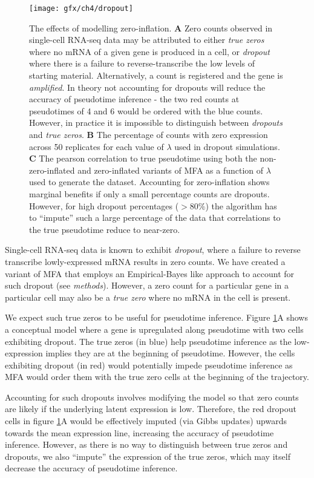 \begin{figure}
	\centering
	\texttt{[image: gfx/ch4/dropout]}
	\caption{The effects of modelling zero-inflation. {\normalfont
\textbf{A} Zero counts observed in single-cell RNA-seq data may be attributed to either \emph{true zeros} where no mRNA of a given gene is produced in a cell, or \emph{dropout} where there is a failure to reverse-transcribe the low levels of starting material. Alternatively, a count is registered and the gene is \emph{amplified}. In theory not accounting for dropouts will reduce the accuracy of pseudotime inference - the two red counts at pseudotimes of 4 and 6 would be ordered with the blue counts. However, in practice it is impossible to distinguish between \emph{dropouts} and \emph{true zeros}.
\textbf{B} The percentage of counts with zero expression across 50 replicates for each value of $\lambda$ used in dropout simulations.
\textbf{C} The pearson correlation to true pseudotime using both the non-zero-inflated and zero-inflated variants of MFA as a function of $\lambda$ used to generate the dataset. Accounting for zero-inflation shows marginal benefits if only a small percentage counts are dropouts. However, for high dropout percentages ($>80\%$) the algorithm has to ``impute'' such a large percentage of the data that correlations to the true pseudotime reduce to near-zero.
	}} \label{fig:dropout_results}
\end{figure}

Single-cell RNA-seq data is known to exhibit \emph{dropout}, where a failure to reverse transcribe lowly-expressed mRNA results in zero counts. We have created a variant of MFA that employs an Empirical-Bayes like approach to account for such dropout (see \emph{methods}). However, a zero count for a particular gene in a particular cell may also be a \emph{true zero} where no mRNA in the cell is present.

We expect such true zeros to be useful for pseudotime inference. Figure \ref{fig:dropout_results}A shows a conceptual model where a gene is upregulated along pseudotime with two cells exhibiting dropout. The true zeros (in blue) help pseudotime inference as the low-expression implies they are at the beginning of pseudotime. However, the cells exhibiting dropout (in red) would potentially impede pseudotime inference as MFA would order them with the true zero cells at the beginning of the trajectory.

Accounting for such dropouts involves modifying the model so that zero counts are likely if the underlying latent expression is low. Therefore, the red dropout cells in figure \ref{fig:dropout_results}A would be effectively imputed (via Gibbs updates) upwards towards the mean expression line, increasing the accuracy of pseudotime inference. However, as there is no way to distinguish between true zeros and dropouts, we also ``impute'' the expression of the true zeros, which may itself decrease the accuracy of pseudotime inference.

